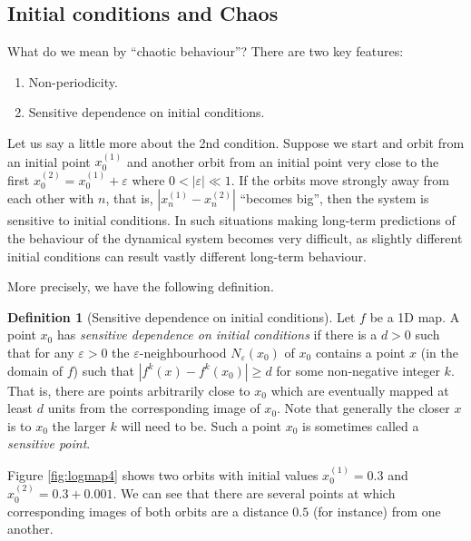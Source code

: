 \documentclass[
  a4paper,
  oneside,
  final]{krantz}
\providecommand{\tightlist}{%
  \setlength{\itemsep}{0pt}\setlength{\parskip}{0pt}}
\renewcommand{\epsilon}{\varepsilon}
\theoremstyle{definition}
\newtheorem{definition}{Definition}[chapter]
\theoremstyle{definition}
\theoremstyle{definition}
\theoremstyle{definition}
\theoremstyle{remark}
\begin{document}
\hypertarget{initial-conditions-chaos}{%
\subsection{Initial conditions and Chaos}\label{initial-conditions-chaos}}

What do we mean by ``chaotic behaviour''? There are two key features:

\begin{enumerate}
\def\labelenumi{\arabic{enumi}.}
\tightlist
\item
  Non-periodicity.
\item
  Sensitive dependence on initial conditions.
\end{enumerate}

Let us say a little more about the 2nd condition. Suppose we start and orbit from an initial point \(x_0^{(1)}\) and another orbit from an initial point very close to the first \(x_0^{(2)} = x_0^{(1)} + \epsilon\) where \(0< |\epsilon| \ll 1\). If the orbits move strongly away from each other with \(n\), that is, \(|x_n^{(1)} - x_{n}^{(2)}|\) ``becomes big'', then the system is sensitive to initial conditions. In such situations making long-term predictions of the behaviour of the dynamical system becomes very difficult, as slightly different initial conditions can result vastly different long-term behaviour.

More precisely, we have the following definition.

\begin{definition}[Sensitive dependence on initial conditions]
\protect\hypertarget{def:sensitivity-to-intial}{}\label{def:sensitivity-to-intial}Let \(f\) be a 1D map. A point \(x_0\) has \emph{sensitive dependence on initial conditions} if there is a \(d>0\) such that for any \(\epsilon >0\) the \(\epsilon\)-neighbourhood \(N_{\epsilon}(x_0)\) of \(x_0\) contains a point \(x\) (in the domain of \(f\)) such that \(|f^k(x) -f^{k}(x_0)| \ge d\) for some non-negative integer \(k\). That is, there are points arbitrarily close to \(x_0\) which are eventually mapped at least \(d\) units from the corresponding image of \(x_0\). Note that generally the closer \(x\) is to \(x_0\) the larger \(k\) will need to be. Such a point \(x_0\) is sometimes called a \emph{sensitive point}.
\end{definition}

Figure \ref{fig:logmap4} shows two orbits with initial values \(x_0^{(1)} = 0.3\) and \(x_0^{(2)} = 0.3 + 0.001\). We can see that there are several points at which corresponding images of both orbits are a distance \(0.5\) (for instance) from one another.
\end{document}
